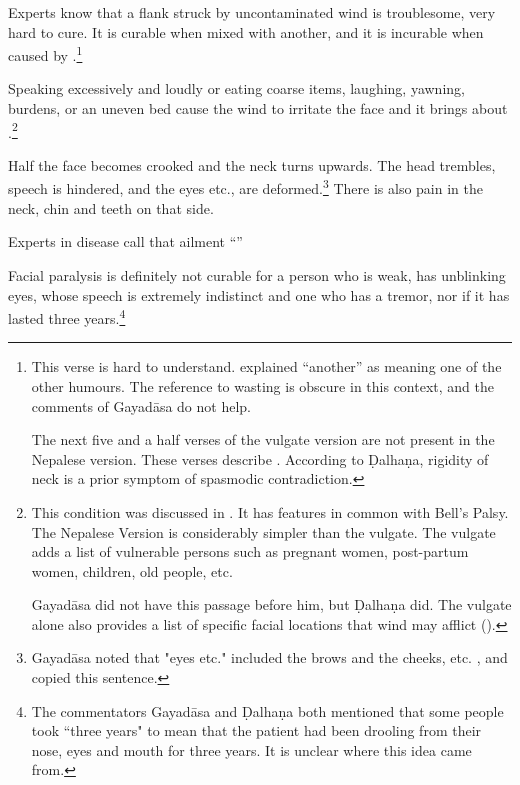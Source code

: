 \begin{translation}
Experts know that a flank struck by uncontaminated wind is troublesome,
very hard to cure. It is curable when mixed with another, and it is
incurable when caused by .\footnote{This verse is
    hard to understand.   explained “another” as
    meaning one of the other humours.  The reference to wasting is obscure
    in this context, and the comments of Gayadāsa \citep[266]{vulgate} do
    not help.
    
   The next five and a half verses of the vulgate version are not
present in the Nepalese version.   These verses describe
. According to Ḍalhaṇa,
rigidity of neck is a prior symptom of spasmodic contradiction.}


%

\item[68cdef, 69cd]

Speaking excessively and loudly or eating coarse items, laughing,
yawning, burdens, or an uneven bed cause the wind to irritate the face
and it brings about  .\label{ardita}\footnote{This 
condition
    was discussed in \cite[122, n.\,69]{wuja-2003}.  It has features in
    common with Bell's Palsy.  The Nepalese Version is considerably
    simpler than the vulgate.  The vulgate adds a list of vulnerable
    persons such as pregnant women, post-partum women, children, old
    people, etc.  
    
    Gayadāsa did not have this passage before him, but
    Ḍalhaṇa did.  The vulgate alone also provides a list of specific
    facial locations that wind may afflict ().}


\item[70--71ab]

Half the face becomes crooked and the neck turns upwards.  The head 
trembles, speech is hindered, and the eyes etc., are 
deformed.\footnote{Gayadāsa noted that "eyes etc." included the 
brows and the cheeks, etc. \citep[267]{vulgate}, and  
copied this sentence.} There is also pain in the neck, chin and teeth on that side.

\item[72cd]

Experts in disease call that ailment ``''

\item[73]

Facial paralysis is definitely not curable for a person who is weak,
has unblinking eyes, whose speech is extremely indistinct and one who
has a tremor, nor if it has lasted three years.\footnote{The commentators 
Gayadāsa and Ḍalhaṇa both mentioned that some people took ``three years" to 
mean that the patient had been drooling from their nose, eyes and mouth for 
three years.  It is unclear where this idea came from.}



\end{translation}
